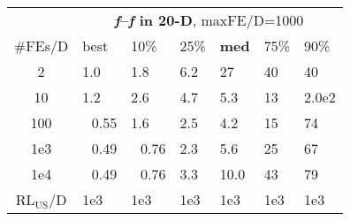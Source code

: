 \begin{tabular}{c|llllll}
 & \multicolumn{6}{|c}{\textbf{\textit{f}\raisebox{-0.35ex}{1}--\textit{f}\raisebox{-0.35ex}{24} in 20-D}, maxFE/D=1000}\\
\#FEs/D & best & 10\% & 25\% & \textbf{med} & 75\% & 90\%\\
2 & \hspace*{1ex}1.0 & \hspace*{1ex}1.8 & \hspace*{1ex}6.2 & 27 & 40 & 40\\
10 & \hspace*{1ex}1.2 & \hspace*{1ex}2.6 & \hspace*{1ex}4.7 & \hspace*{1ex}5.3 & 13 & 2.0e2\\
100 & ~\,0.55 & \hspace*{1ex}1.6 & \hspace*{1ex}2.5 & \hspace*{1ex}4.2 & 15 & 74\\
1e3 & ~\,0.49 & ~\,0.76 & \hspace*{1ex}2.3 & \hspace*{1ex}5.6 & 25 & 67\\
1e4 & ~\,0.49 & ~\,0.76 & \hspace*{1ex}3.3 & \hspace*{1ex}10.0 & 43 & 79\\
$\text{RL}_{\text{US}}$/D & 1e3 & 1e3 & 1e3 & 1e3 & 1e3 & 1e3
\end{tabular}
